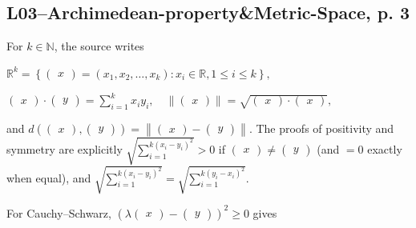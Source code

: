 \subsection{L03--Archimedean-property\&Metric-Space, p. 3}

For \(k \in \mathbb{N}\), the source writes

\(\mathbb{R}^{k} = \left\{ {\begin{pmatrix}
x
\end{pmatrix} = \left( {x_{1},x_{2},\ldots,x_{k}} \right):x_{i} \in \mathbb{R},1 \leq i \leq k} \right\},\)

\(\begin{pmatrix}
x
\end{pmatrix} \cdot \begin{pmatrix}
y
\end{pmatrix} = \sum_{i = 1}^{k}x_{i}y_{i},\quad\left\| \begin{pmatrix}
x
\end{pmatrix} \right\| = \sqrt{\begin{pmatrix}
x
\end{pmatrix} \cdot \begin{pmatrix}
x
\end{pmatrix}},\)

and \(d\left( {\begin{pmatrix}
x
\end{pmatrix},\begin{pmatrix}
y
\end{pmatrix}} \right) = \left\| {\begin{pmatrix}
x
\end{pmatrix} - \begin{pmatrix}
y
\end{pmatrix}} \right\|\). The proofs of positivity and symmetry are explicitly \(\sqrt{\sum_{i = 1}^{{k{({x_{i} - y_{i}})}}^{2}}} > 0\) if \(\begin{pmatrix}
x
\end{pmatrix} \neq \begin{pmatrix}
y
\end{pmatrix}\) (and \(= 0\) exactly when equal), and \(\sqrt{\sum_{i = 1}^{{k{({x_{i} - y_{i}})}}^{2}}} = \sqrt{\sum_{i = 1}^{{k{({y_{i} - x_{i}})}}^{2}}}\).

For Cauchy--Schwarz, \(\left( {\lambda\begin{pmatrix}
x
\end{pmatrix} - \begin{pmatrix}
y
\end{pmatrix}} \right)^{2} \geq 0\) gives

